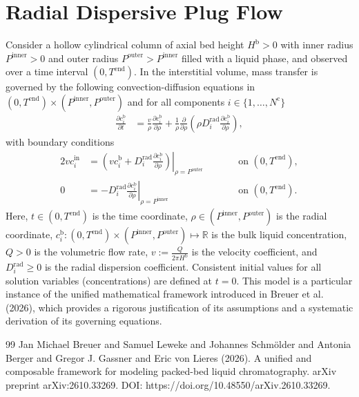 \documentclass{article}
\begin{document}
\section*{Radial Dispersive Plug Flow}
Consider a hollow cylindrical column of axial bed height $H^{\mathrm{b}} > 0$ with inner radius $P^{\mathrm{inner}} > 0$ and outer radius $P^{\mathrm{outer}} > P^{\mathrm{inner}}$ filled with a liquid phase, and observed over a time interval $(0, T^{\mathrm{end}})$.
In the interstitial volume, mass transfer is governed by the following convection-diffusion equations in $(0, T^{\mathrm{end}})\times (P^{\mathrm{inner}}, P^{\mathrm{outer}})$ and for all components $i\in\{1, \dots, N^{\mathrm{c}} \}$
\begin{align}
    \frac{\partial c^{\mathrm{b}}_{i}}{\partial t}
    &= \frac{v}{\rho} \frac{\partial c^{\mathrm{b}}_{i}}{\partial \rho}
        + \frac{1}{\rho} \frac{\partial}{\partial \rho} \left( \rho D^{\mathrm{rad}}_{i} \frac{\partial c^{\mathrm{b}}_{i}}{\partial \rho} \right),
\end{align}
with boundary conditions
\begin{alignat}{2}
    v c^{\mathrm{in}}_{i}
    &= \left.\left( v c^{\mathrm{b}}_{i} + D^{\mathrm{rad}}_{i} \frac{\partial c^{\mathrm{b}}_{i}}{\partial \rho}\right)\right|_{\rho=P^{\mathrm{outer}}}
    & & \qquad\text{on }(0, T^{\mathrm{end}}),
    \\
    0
    &= - D^{\mathrm{rad}}_{i} \left. \frac{\partial c^{\mathrm{b}}_{i}}{\partial \rho} \right|_{\rho=P^{\mathrm{inner}}}
    & & \qquad\text{on }(0, T^{\mathrm{end}}).
\end{alignat}
Here, $t\in (0, T^{\mathrm{end}})$ is the time coordinate, $\rho\in (P^{\mathrm{inner}}, P^{\mathrm{outer}})$ is the radial coordinate, $c^{\mathrm{b}}_{i}\colon (0, T^{\mathrm{end}})\times (P^{\mathrm{inner}}, P^{\mathrm{outer}}) \mapsto \mathbb{R}$ is the bulk liquid concentration, $Q> 0$ is the volumetric flow rate, $v:= \frac{Q}{2 \pi H^{\mathrm{b}}}$ is the velocity coefficient, and $D^{\mathrm{rad}}_{i}\geq 0$ is the radial dispersion coefficient.
Consistent initial values for all solution variables (concentrations) are defined at $t = 0$.
This model is a particular instance of the unified mathematical framework introduced in Breuer et al. (2026), which provides a rigorous justification of its assumptions and a systematic derivation of its governing equations.
\begin{thebibliography}{99}
     Jan Michael Breuer and Samuel Leweke and Johannes Schmölder and Antonia Berger and Gregor J. Gassner and Eric von Lieres (2026). A unified and composable framework for modeling packed-bed liquid chromatography. arXiv preprint arXiv:2610.33269. DOI: https://doi.org/10.48550/arXiv.2610.33269.
\end{thebibliography}
\end{document}
